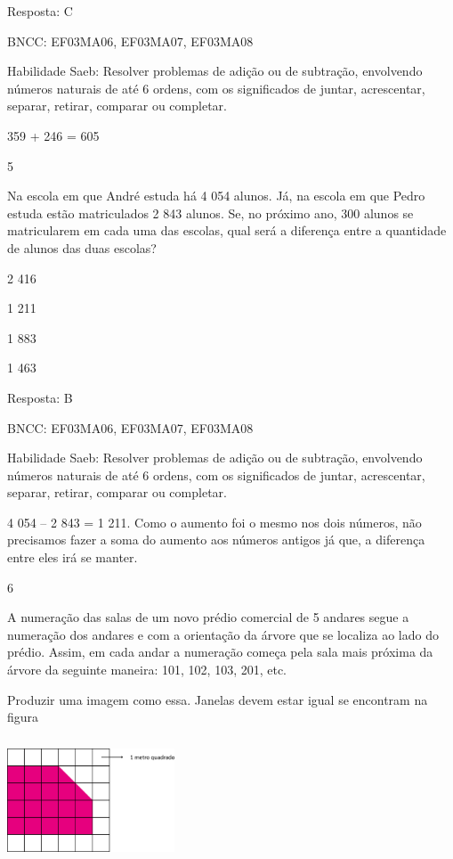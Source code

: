 \begin{escolha}
{\begin{escolha}
{Resposta: C

BNCC: EF03MA06, EF03MA07, EF03MA08

Habilidade Saeb: Resolver problemas de adição ou de subtração,
envolvendo números naturais de até 6 ordens, com os significados de
juntar, acrescentar, separar, retirar, comparar ou completar.

359 + 246 = 605

\num{5}

Na escola em que André estuda há 4 054 alunos. Já, na escola em que
Pedro estuda estão matriculados 2 843 alunos. Se, no próximo ano, 300
alunos se matricularem em cada uma das escolas, qual será a diferença
entre a quantidade de alunos das duas escolas?

\begin{escolha}
\item
  2 416
\item
  1 211
\item
  1 883
\item
  1 463
\end{escolha}

Resposta: B

BNCC: EF03MA06, EF03MA07, EF03MA08

Habilidade Saeb: Resolver problemas de adição ou de subtração,
envolvendo números naturais de até 6 ordens, com os significados de
juntar, acrescentar, separar, retirar, comparar ou completar.

4 054 -- 2 843 = 1 211. Como o aumento foi o mesmo nos dois números, não
precisamos fazer a soma do aumento aos números antigos já que, a
diferença entre eles irá se manter.

\num{6}

A numeração das salas de um novo prédio comercial de 5 andares segue a
numeração dos andares e com a orientação da árvore que se localiza ao
lado do prédio. Assim, em cada andar a numeração começa pela sala mais
próxima da árvore da seguinte maneira: 101, 102, 103, 201, etc.

Produzir uma imagem como essa. Janelas devem estar igual se encontram na
figura

\includegraphics[width=1.96154in,height=1.44792in]{media/image108.png}

}
\end{escolha}}
\end{escolha}
